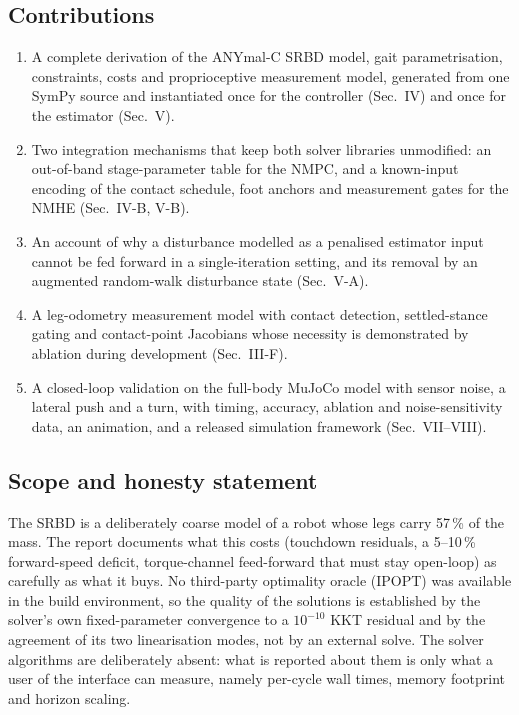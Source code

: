\documentclass[11pt]{article}
\begin{document}
\subsection{Contributions}
\begin{enumerate}
\item A complete derivation of the ANYmal-C SRBD model, gait parametrisation, constraints, costs and proprioceptive measurement model, generated from one SymPy source and instantiated once for the controller (Sec.~IV) and once for the estimator (Sec.~V).
\item Two integration mechanisms that keep both solver libraries unmodified: an out-of-band stage-parameter table for the NMPC, and a known-input encoding of the contact schedule, foot anchors and measurement gates for the NMHE (Sec.~IV-B, V-B).
\item An account of why a disturbance modelled as a penalised estimator input cannot be fed forward in a single-iteration setting, and its removal by an augmented random-walk disturbance state (Sec.~V-A).
\item A leg-odometry measurement model with contact detection, settled-stance gating and contact-point Jacobians whose necessity is demonstrated by ablation during development (Sec.~III-F).
\item A closed-loop validation on the full-body MuJoCo model with sensor noise, a lateral push and a turn, with timing, accuracy, ablation and noise-sensitivity data, an animation, and a released simulation framework (Sec.~VII--VIII).
\end{enumerate}

\subsection{Scope and honesty statement}
The SRBD is a deliberately coarse model of a robot whose legs carry 57\,\% of the mass. The report documents what this costs (touchdown residuals, a 5--10\,\% forward-speed deficit, torque-channel feed-forward that must stay open-loop) as carefully as what it buys. No third-party optimality oracle (IPOPT) was available in the build environment, so the quality of the solutions is established by the solver's own fixed-parameter convergence to a $10^{-10}$ KKT residual and by the agreement of its two linearisation modes, not by an external solve. The solver algorithms are deliberately absent: what is reported about them is only what a user of the interface can measure, namely per-cycle wall times, memory footprint and horizon scaling.
\end{document}
